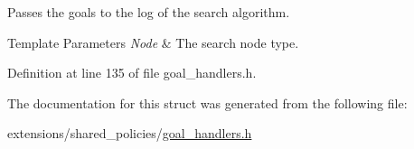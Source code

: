 Passes the goals to the log of the search algorithm. 


\begin{DoxyTemplParams}{Template Parameters}
{\em Node} & The search node type. \\
\hline
\end{DoxyTemplParams}


Definition at line 135 of file goal\+\_\+handlers.\+h.



The documentation for this struct was generated from the following file\+:\begin{DoxyCompactItemize}
\item 
extensions/shared\+\_\+policies/\hyperlink{goal__handlers_8h}{goal\+\_\+handlers.\+h}\end{DoxyCompactItemize}
